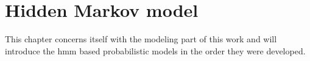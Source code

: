 \documentclass[\relativeRoot/main.tex]{subfiles}
\begin{document}
\chapter{Hidden Markov model}
\label{chap:hmm}

This chapter concerns itself with the modeling part of this work and will introduce the \gls{hmm} based probabilistic models in the order they were developed.



\end{document}
